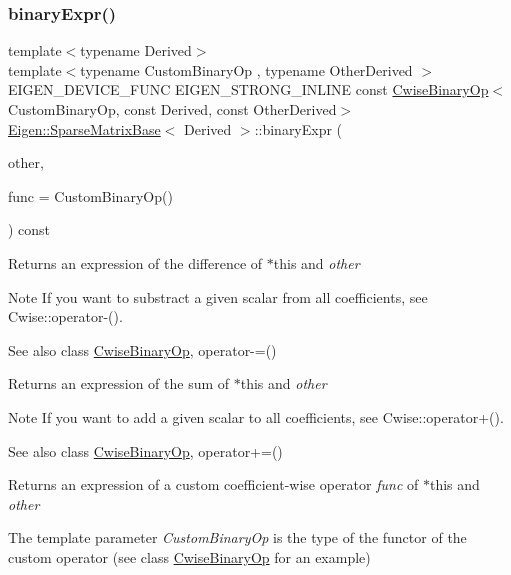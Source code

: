 \subsubsection{\texorpdfstring{binaryExpr()}{binaryExpr()}}
{\footnotesize\ttfamily template$<$typename Derived$>$ \\
template$<$typename Custom\+Binary\+Op , typename Other\+Derived $>$ \\
E\+I\+G\+E\+N\+\_\+\+D\+E\+V\+I\+C\+E\+\_\+\+F\+U\+NC E\+I\+G\+E\+N\+\_\+\+S\+T\+R\+O\+N\+G\+\_\+\+I\+N\+L\+I\+NE const \mbox{\hyperlink{class_eigen_1_1_cwise_binary_op}{Cwise\+Binary\+Op}}$<$Custom\+Binary\+Op, const Derived, const Other\+Derived$>$ \mbox{\hyperlink{class_eigen_1_1_sparse_matrix_base}{Eigen\+::\+Sparse\+Matrix\+Base}}$<$ Derived $>$\+::binary\+Expr (\begin{DoxyParamCaption}\item[{const E\+I\+G\+E\+N\+\_\+\+C\+U\+R\+R\+E\+N\+T\+\_\+\+S\+T\+O\+R\+A\+G\+E\+\_\+\+B\+A\+S\+E\+\_\+\+C\+L\+A\+SS$<$ Other\+Derived $>$ \&}]{other,  }\item[{const Custom\+Binary\+Op \&}]{func = {\ttfamily CustomBinaryOp()} }\end{DoxyParamCaption}) const\hspace{0.3cm}{\ttfamily [inline]}}

\begin{DoxyReturn}{Returns}
an expression of the difference of {\ttfamily $\ast$this} and {\itshape other} 
\end{DoxyReturn}
\begin{DoxyNote}{Note}
If you want to substract a given scalar from all coefficients, see Cwise\+::operator-\/().
\end{DoxyNote}
\begin{DoxySeeAlso}{See also}
class \mbox{\hyperlink{class_eigen_1_1_cwise_binary_op}{Cwise\+Binary\+Op}}, operator-\/=()
\end{DoxySeeAlso}
\begin{DoxyReturn}{Returns}
an expression of the sum of {\ttfamily $\ast$this} and {\itshape other} 
\end{DoxyReturn}
\begin{DoxyNote}{Note}
If you want to add a given scalar to all coefficients, see Cwise\+::operator+().
\end{DoxyNote}
\begin{DoxySeeAlso}{See also}
class \mbox{\hyperlink{class_eigen_1_1_cwise_binary_op}{Cwise\+Binary\+Op}}, operator+=()
\end{DoxySeeAlso}
\begin{DoxyReturn}{Returns}
an expression of a custom coefficient-\/wise operator {\itshape func} of $\ast$this and {\itshape other} 
\end{DoxyReturn}
The template parameter {\itshape Custom\+Binary\+Op} is the type of the functor of the custom operator (see class \mbox{\hyperlink{class_eigen_1_1_cwise_binary_op}{Cwise\+Binary\+Op}} for an example)

